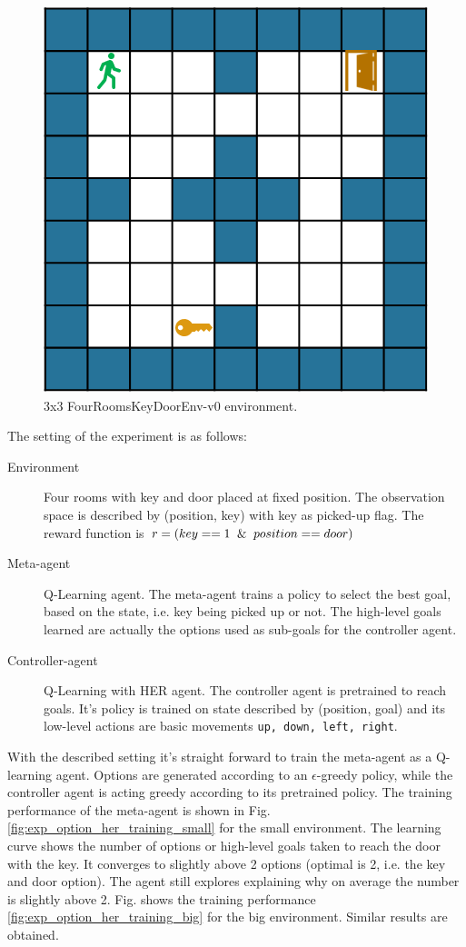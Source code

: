 \documentclass[conference]{IEEEtran}
\begin{document}
\begin{figure}[ht]
\centering
\includegraphics[width=0.5\columnwidth]{img/FourRoomsKeyDoorEnv-v0.png}
\caption{3x3 FourRoomsKeyDoorEnv-v0 environment.}
\label{fig:experiment_option_her_keydoor_env}
\end{figure}

The setting of the experiment is as follows:
\begin{description}
\item[Environment] Four rooms with key and door placed at fixed position. The observation space is described by (position, key) with key as picked-up flag. The reward function is $r = (key==1 \And position==door)$
\item[Meta-agent] Q-Learning agent. The meta-agent trains a policy to select the best goal, based on the state, i.e. key being picked up or not. The high-level goals learned are actually the options used as sub-goals for the controller agent. 
\item[Controller-agent] Q-Learning with HER agent. The controller agent is pretrained to reach goals. It's policy is trained on state described by (position, goal) and its low-level actions are basic movements \texttt{up, down, left, right}.
\end{description}

With the described setting it's straight forward to train the meta-agent as a Q-learning agent. Options are generated according to an $\epsilon$-greedy policy, while the controller agent is acting greedy according to its pretrained policy. The training performance of the meta-agent is shown in Fig. \ref{fig:exp_option_her_training_small} for the small environment.  The learning curve shows the number of options or high-level goals taken to reach the door with the key. It converges to slightly above 2 options (optimal is 2, i.e. the key and door option). The agent still explores explaining why on average the number is slightly above 2. Fig. shows the training performance \ref{fig:exp_option_her_training_big} for the big environment. Similar results are obtained.
\end{document}
